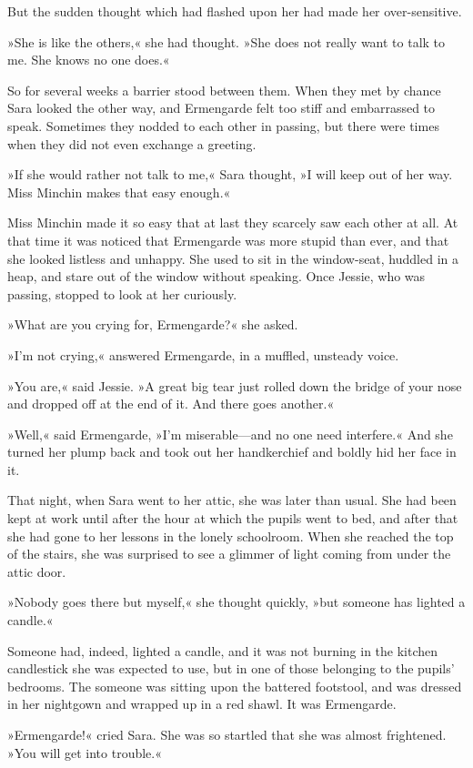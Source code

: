 But the sudden thought which had flashed upon her had made her over-sensitive.

»She is like the others,« she had thought. »She does not really want to talk to me. She knows no one does.«

So for several weeks a barrier stood between them. When they met by chance Sara looked the other way, and Ermengarde felt too stiff and embarrassed to speak. Sometimes they nodded to each other in passing, but there were times when they did not even exchange a greeting.

»If she would rather not talk to me,« Sara thought, »I will keep out of her way. Miss Minchin makes that easy enough.«

Miss Minchin made it so easy that at last they scarcely saw each other at all. At that time it was noticed that Ermengarde was more stupid than ever, and that she looked listless and unhappy. She used to sit in the window-seat, huddled in a heap, and stare out of the window without speaking. Once Jessie, who was passing, stopped to look at her curiously.

»What are you crying for, Ermengarde?« she asked.

»I'm not crying,« answered Ermengarde, in a muffled, unsteady voice.

»You are,« said Jessie. »A great big tear just rolled down the bridge of your nose and dropped off at the end of it. And there goes another.«

»Well,« said Ermengarde, »I'm miserable—and no one need interfere.« And she turned her plump back and took out her handkerchief and boldly hid her face in it.

That night, when Sara went to her attic, she was later than usual. She had been kept at work until after the hour at which the pupils went to bed, and after that she had gone to her lessons in the lonely schoolroom. When she reached the top of the stairs, she was surprised to see a glimmer of light coming from under the attic door.

»Nobody goes there but myself,« she thought quickly, »but someone has lighted a candle.«

Someone had, indeed, lighted a candle, and it was not burning in the kitchen candlestick she was expected to use, but in one of those belonging to the pupils' bedrooms. The someone was sitting upon the battered footstool, and was dressed in her nightgown and wrapped up in a red shawl. It was Ermengarde.

»Ermengarde!« cried Sara. She was so startled that she was almost frightened. »You will get into trouble.«

